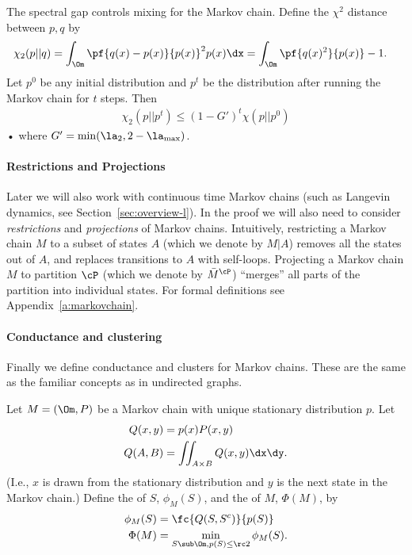 The spectral gap controls mixing for the Markov chain. Define the $\chi^2$ distance between $p,q$ by
\begin{align}
\chi_2(p||q) &= \int_\Om \pf{q(x)-p(x)}{p(x)}^2p(x)\dx
= \int_\Om \pf{q(x)^2}{p(x)} - 1.
\end{align}
Let $p^0$ be any initial distribution and $p^t$ be the distribution after running the Markov chain for $t$ steps. Then
\begin{align}\label{eq:gap-mix}
\chi_2(p||p^t) \le (1-G')^t \chi(p||p^0)
\end{align}•
where $G'=\min(\la_2, 2-\la_{\max})$. 

\paragraph{Restrictions and Projections}
Later we will also work with continuous time Markov chains (such as Langevin dynamics, see Section~\ref{sec:overview-l}). In the proof we will also need to consider {\em restrictions} and {\em projections} of Markov chains. Intuitively, restricting a Markov chain $M$ to a subset of states $A$ (which we denote by $M|A$) removes all the states out of $A$, and replaces transitions to $A$ with self-loops. Projecting a Markov chain $M$ to partition $\cP$ (which we denote by $\bar{M}^\cP$) ``merges'' all parts of the partition into individual states. For formal definitions see Appendix~\ref{a:markovchain}.

\paragraph{Conductance and clustering} Finally we define conductance and clusters for Markov chains. These are the same as the familiar concepts as in undirected graphs.

\begin{df}\label{df:conduct}
Let $M=(\Om, P)$ be a Markov chain with unique stationary distribution $p$. Let
\begin{align}
Q(x,y) &= p(x) P(x,y)\\
Q(A,B) & = \iint_{A\times B} Q(x,y)\dx\dy.
\end{align}
(I.e., $x$ is drawn from the stationary distribution and $y$ is the next state in the Markov chain.)
Define the  of $S$, $\phi_M(S)$, and the  of $M$, $\Phi(M)$, by
\begin{align}
\phi_M(S) & = \fc{Q(S,S^c)}{p(S)}\\
\Phi(M) &= \min_{S\sub \Om, p(S)\le \rc 2}
\phi_M(S).
\end{align}
\end{df}

